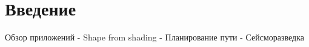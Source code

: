 \section*{Введение}
\label{intro}

Обзор приложений
- Shape from shading
- Планирование пути
- Сейсморазведка



